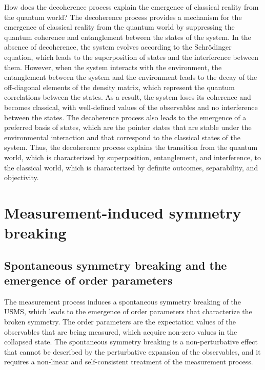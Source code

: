 \begin{tcolorbox}[colback=green!5!white,colframe=green!75!black,title=Question]
How does the decoherence process explain the emergence of classical reality from the quantum world?
\tcblower
The decoherence process provides a mechanism for the emergence of classical reality from the quantum world by suppressing the quantum coherence and entanglement between the states of the system. In the absence of decoherence, the system evolves according to the Schrödinger equation, which leads to the superposition of states and the interference between them. However, when the system interacts with the environment, the entanglement between the system and the environment leads to the decay of the off-diagonal elements of the density matrix, which represent the quantum correlations between the states. As a result, the system loses its coherence and becomes classical, with well-defined values of the observables and no interference between the states. The decoherence process also leads to the emergence of a preferred basis of states, which are the pointer states that are stable under the environmental interaction and that correspond to the classical states of the system. Thus, the decoherence process explains the transition from the quantum world, which is characterized by superposition, entanglement, and interference, to the classical world, which is characterized by definite outcomes, separability, and objectivity.
\end{tcolorbox}

\section{Measurement-induced symmetry breaking}
\subsection{Spontaneous symmetry breaking and the emergence of order parameters}
The measurement process induces a spontaneous symmetry breaking of the USMS, which leads to the emergence of order parameters that characterize the broken symmetry. The order parameters are the expectation values of the observables that are being measured, which acquire non-zero values in the collapsed state. The spontaneous symmetry breaking is a non-perturbative effect that cannot be described by the perturbative expansion of the observables, and it requires a non-linear and self-consistent treatment of the measurement process.

